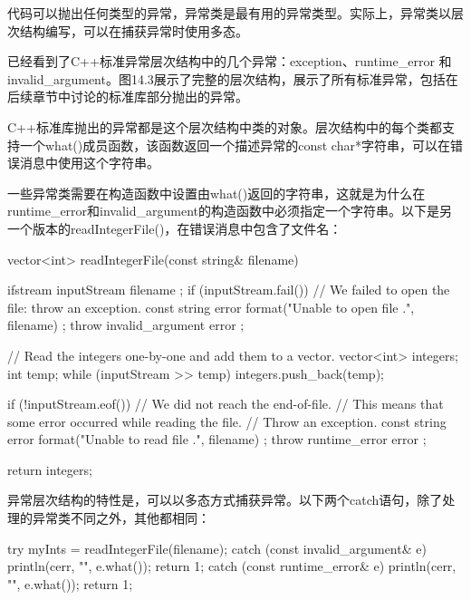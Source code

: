 
代码可以抛出任何类型的异常，异常类是最有用的异常类型。实际上，异常类以层次结构编写，可以在捕获异常时使用多态。


已经看到了C++标准异常层次结构中的几个异常：exception、runtime\_error 和 invalid\_argument。图14.3展示了完整的层次结构，展示了所有标准异常，包括在后续章节中讨论的标准库部分抛出的异常。


C++标准库抛出的异常都是这个层次结构中类的对象。层次结构中的每个类都支持一个what()成员函数，该函数返回一个描述异常的const char*字符串，可以在错误消息中使用这个字符串。

一些异常类需要在构造函数中设置由what()返回的字符串，这就是为什么在runtime\_error和invalid\_argument的构造函数中必须指定一个字符串。以下是另一个版本的readIntegerFile()，在错误消息中包含了文件名：

\begin{cpp}
vector<int> readIntegerFile(const string& filename)
{
    ifstream inputStream { filename };
    if (inputStream.fail()) {
        // We failed to open the file: throw an exception.
        const string error { format("Unable to open file {}.", filename) };
        throw invalid_argument { error };
    }

    // Read the integers one-by-one and add them to a vector.
    vector<int> integers;
    int temp;
    while (inputStream >> temp) {
        integers.push_back(temp);
    }

    if (!inputStream.eof()) {
        // We did not reach the end-of-file.
        // This means that some error occurred while reading the file.
        // Throw an exception.
        const string error { format("Unable to read file {}.", filename) };
        throw runtime_error { error };
    }

    return integers;
}
\end{cpp}


异常层次结构的特性是，可以以多态方式捕获异常。以下两个catch语句，除了处理的异常类不同之外，其他都相同：

\begin{cpp}
try {
    myInts = readIntegerFile(filename);
} catch (const invalid_argument& e) {
    println(cerr, "{}", e.what());
    return 1;
} catch (const runtime_error& e) {
    println(cerr, "{}", e.what());
    return 1;
}
\end{cpp}

